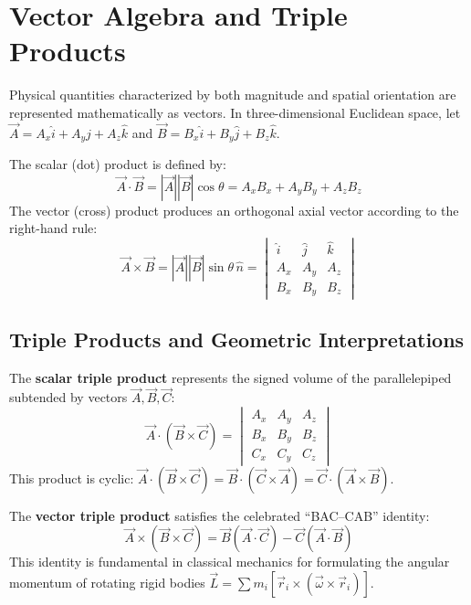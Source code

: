 \section{Vector Algebra and Triple Products}
Physical quantities characterized by both magnitude and spatial orientation are represented mathematically as vectors. In three-dimensional Euclidean space, let $\vec{A} = A_x\hat{i} + A_y\hat{j} + A_z\hat{k}$ and $\vec{B} = B_x\hat{i} + B_y\hat{j} + B_z\hat{k}$.

The scalar (dot) product is defined by:
\begin{equation}
\vec{A} \cdot \vec{B} = |\vec{A}||\vec{B}|\cos\theta = A_x B_x + A_y B_y + A_z B_z
\end{equation}
The vector (cross) product produces an orthogonal axial vector according to the right-hand rule:
\begin{equation}
\vec{A} \times \vec{B} = |\vec{A}||\vec{B}|\sin\theta\,\hat{n} = \begin{vmatrix} \hat{i} & \hat{j} & \hat{k} \\ A_x & A_y & A_z \\ B_x & B_y & B_z \end{vmatrix}
\end{equation}

\subsection{Triple Products and Geometric Interpretations}
The \textbf{scalar triple product} represents the signed volume of the parallelepiped subtended by vectors $\vec{A}, \vec{B}, \vec{C}$:
\begin{equation}
\vec{A} \cdot (\vec{B} \times \vec{C}) = \begin{vmatrix} A_x & A_y & A_z \\ B_x & B_y & B_z \\ C_x & C_y & C_z \end{vmatrix}
\end{equation}
This product is cyclic: $\vec{A} \cdot (\vec{B} \times \vec{C}) = \vec{B} \cdot (\vec{C} \times \vec{A}) = \vec{C} \cdot (\vec{A} \times \vec{B})$.

The \textbf{vector triple product} satisfies the celebrated ``BAC--CAB'' identity:
\begin{equation}
\vec{A} \times (\vec{B} \times \vec{C}) = \vec{B}(\vec{A} \cdot \vec{C}) - \vec{C}(\vec{A} \cdot \vec{B})
\end{equation}
This identity is fundamental in classical mechanics for formulating the angular momentum of rotating rigid bodies $\vec{L} = \sum m_i [\vec{r}_i \times (\vec{\omega} \times \vec{r}_i)]$.

